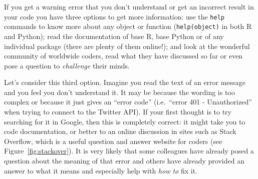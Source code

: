 

If you get a warning error that you don't understand or get an incorrect result in your code you have three options to get more information: use the \texttt{help} commands to know more about any object or function (\verb|help(object)| in both R and  Python); read the documentation of base R, base Python or of any individual package (there are plenty of them online!); and look at the wonderful community of worldwide coders, read what they have discussed so far or even pose a question to \textit{challenge} their minds.

Let's consider this third option. Imagine you read the text of an error message and you feel you don't understand it.
It may be because the wording is too complex or because it just gives an ``error code''
(i.e.\ ``error 401 - Unauthorized'' when trying to connect to the Twitter API).
If your first thought is to try searching for it in Google, then this is completely correct:
it might take you to code documentation, or better to an online discussion in sites such as Stack Overflow,
which is a useful question and answer website for coders (see Figure~\ref{fig:stackover}).
It is very likely that some colleagues have already posed a question about the meaning of that error
and others have already provided an answer to what it means and especially help with \textit{how to} fix it.

